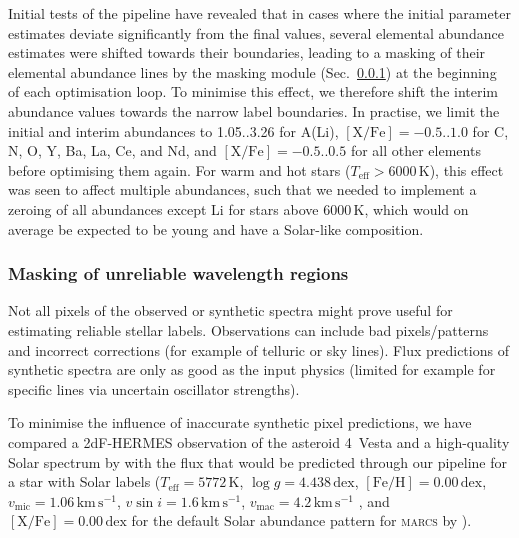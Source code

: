 \documentclass[
  journal=pasa,
  manuscript=research-paper, %
  year=2023,
  volume=37
]{cup-journal}
\newcommand{\marcs}{\textsc{marcs}\xspace}
\newcommand{\dex}{\,\mathrm{dex}}	%
\newcommand{\K}{\,\mathrm{K}}	%
\newcommand{\kms}{\,\mathrm{km\,s^{-1}}}	%
\begin{document}
Initial tests of the pipeline have revealed that in cases where the initial parameter estimates deviate significantly from the final values, several elemental abundance estimates were shifted towards their boundaries, leading to a masking of their elemental abundance lines by the masking module (Sec.~\ref{sec:masking_of_unreliable_wavelength_regions}) at the beginning of each optimisation loop. To minimise this effect, we therefore shift the interim abundance values towards the narrow label boundaries. In practise, we limit the initial and interim abundances to 1.05..3.26 for A(Li), $\mathrm{[X/Fe]} = -0.5..1.0$ for C, N, O, Y, Ba, La, Ce, and Nd, and $\mathrm{[X/Fe]} = -0.5..0.5$ for all other elements before optimising them again. For warm and hot stars ($T_\text{eff} > 6000\K$), this effect was seen to affect multiple abundances, such that we needed to implement a zeroing of all abundances except Li for stars above $6000\K$, which would on average be expected to be young and have a Solar-like composition.

\subsubsection{Masking of unreliable wavelength regions} \label{sec:masking_of_unreliable_wavelength_regions}

Not all pixels of the observed or synthetic spectra might prove useful for estimating reliable stellar labels. Observations can include bad pixels/patterns and incorrect corrections (for example of telluric or sky lines). Flux predictions of synthetic spectra are only as good as the input physics (limited for example for specific lines via uncertain oscillator strengths).

To minimise the influence of inaccurate synthetic pixel predictions, we have compared a 2dF-HERMES observation of the asteroid 4~Vesta and a high-quality Solar spectrum by \citet{Hinkle2000} with the flux that would be predicted through our pipeline for a star with Solar labels ($T_\text{eff} = 5772\K$, $\log g = 4.438\dex$, $\mathrm{[Fe/H]} = 0.00\dex$, $v_\text{mic} = 1.06\kms$, $v \sin i = 1.6\kms$, $v_\text{mac} = 4.2\kms$ \citep{Prsa2016, Jofre2017}, and $\mathrm{[X/Fe]} = 0.00\dex$ for the default Solar abundance pattern for \marcs by \citet{Grevesse2007}).
\end{document}
